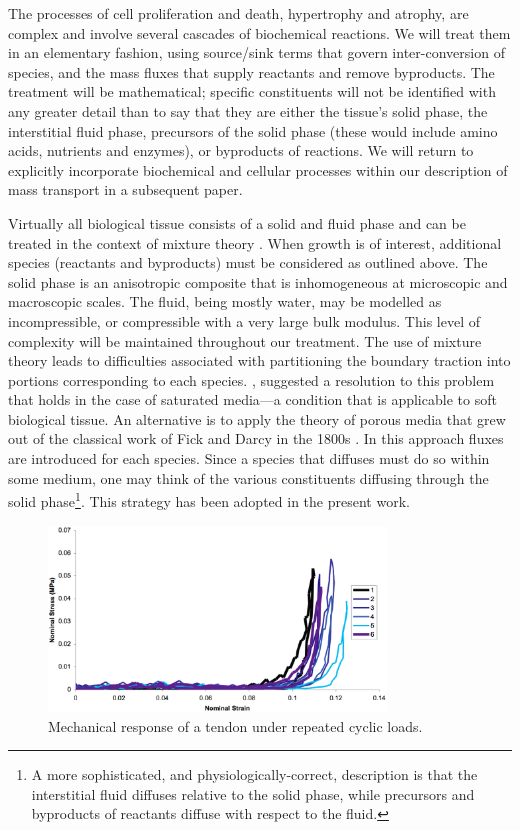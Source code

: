 The processes of cell proliferation and death, hypertrophy and
atrophy, are complex and involve several cascades of biochemical
reactions. We will treat them in an elementary fashion, using
source/sink terms that govern inter-conversion of species, and the
mass fluxes that supply reactants and remove byproducts. The
treatment will be mathematical; specific constituents will not be
identified with any greater detail than to say that they are
either the tissue's solid phase, the interstitial fluid phase,
precursors of the solid phase (these would include amino acids,
nutrients and enzymes), or byproducts of reactions. We will return
to explicitly incorporate biochemical and cellular processes
within our description of mass transport in a subsequent paper.

Virtually all biological tissue consists of a solid and fluid
phase and can be treated in the context of mixture theory
\citep{TruesdellToupin:60,TruesdellNoll:65,BedfordDrumheller:1983}.
When growth is of interest, additional species (reactants and
byproducts) must be considered as outlined above. The solid phase
is an anisotropic composite that is inhomogeneous at microscopic
and macroscopic scales. The fluid, being mostly water, may be
modelled as incompressible, or compressible with a very large bulk
modulus. This level of complexity will be maintained throughout
our treatment. The use of mixture theory leads to difficulties
associated with partitioning the boundary traction into portions
corresponding to each species. \cite{RajagopalWineman:1990},
suggested a resolution to this problem that holds in the case of
saturated media---a condition that is applicable to soft
biological tissue. An alternative is to apply the theory of porous
media that grew out of the classical work of Fick and Darcy in the
1800s \citep{Terzaghi:1943,deBoer:2000}. In this approach fluxes
are introduced for each species. Since a species that diffuses
must do so within some medium, one may think of the various
constituents diffusing through the solid phase\footnote{A more
sophisticated, and physiologically-correct, description is that
the interstitial fluid diffuses relative to the solid phase, while
precursors and byproducts of reactants diffuse with respect to the
fluid.}. This strategy has been adopted in the present work.

\begin{figure}[!hpt]
\centering
\includegraphics[width=0.8\textwidth]
                {images/experiments/tendon-cyclic-load} 
\caption{Mechanical response of a tendon under repeated cyclic loads.}
\label{tendon-cyclic-load}
\end{figure}

